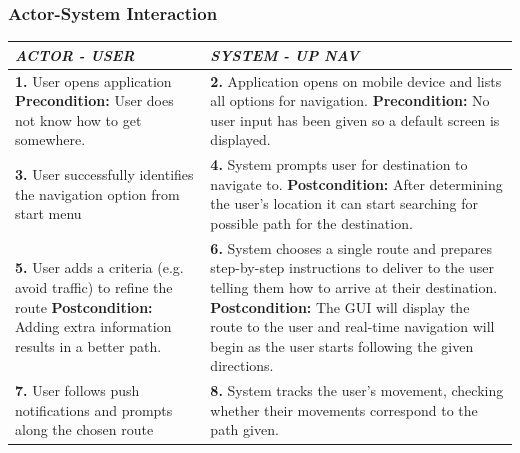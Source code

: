 \documentclass[a4paper,12pt]{article}
\begin{document}
\subsubsection{Actor-System Interaction}
\begin{table}[!htbp]
\footnotesize
\label{tab:table 3.2.3}
\bgroup
\def\arraystretch{1.3}
\begin{tabular}{|L|L|}
\hline
\textbf{\textit{ACTOR - USER}} & \textbf{\textit{SYSTEM - UP NAV}}
\\
\hline
\textbf{1.} User opens application \linebreak \linebreak
\textbf{Precondition:} User does not know how to get somewhere. & \textbf{2.} Application opens on mobile device and lists all options for navigation. \linebreak \linebreak
\textbf{Precondition:} No user input has been given so a default screen is displayed.
\\
\hline
\textbf{3.} User successfully identifies the navigation option from start menu \linebreak \linebreak
& \textbf{4.} System prompts user for destination to navigate to. \linebreak \linebreak
\textbf{Postcondition:} After determining the user's location it can start searching for possible path for the destination.
\\
\hline
\textbf{5.} User adds a criteria (e.g. avoid traffic) to refine the route \linebreak \linebreak
\textbf{Postcondition:} Adding extra information results in a better path.
& \textbf{6.} System chooses a single route and prepares step-by-step instructions to deliver to the user telling them how to arrive at their destination. \linebreak \linebreak 
\textbf{Postcondition:} The GUI will display the route to the user and real-time navigation will begin as the user starts following the given directions.
\\
\hline
\textbf{7.} User follows push notifications and prompts along the chosen route \linebreak
& \textbf{8.} System tracks the user's movement, checking whether their movements correspond to the path given. \linebreak
\\

\end{tabular}
\end{table}
\end{document}
